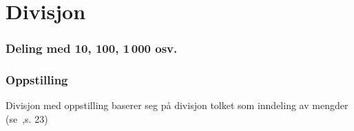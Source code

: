 \section{Divisjon}
\subsubsection{Deling med 10, 100, 1\,000 osv.}
\subsubsection{Oppstilling}
Divisjon med oppstilling baserer seg på divisjon tolket som inndeling av mengder (se \mb\,,s. 23)

\begin{center}
	\parbox{0.3\linewidth}{
}\qquad
\parbox{0.45\linewidth}{
}
\end{center}
